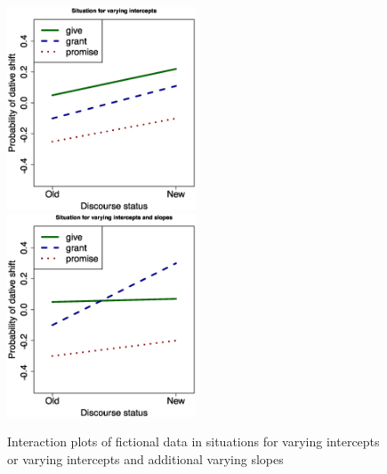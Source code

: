 \begin{figure}[!htpb]
  \centering
  \includegraphics[width=0.5\textwidth]{eps/var_int}~\includegraphics[width=0.5\textwidth]{eps/var_int_slope}
  \caption{Interaction plots of fictional data in situations for varying intercepts or varying intercepts and additional varying slopes}
  \label{fig:varintlsope}
\end{figure}

